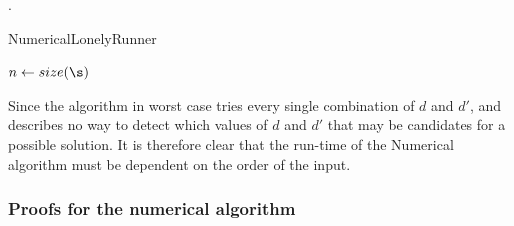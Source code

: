  .

\begin{algorithm}[H]
  \caption{NumericalLonelyRunner}
  \highlights
  
  $n \gets size(\s)$

  \return \no
\end{algorithm}

Since the algorithm in worst case tries every single combination of
$d$ and $d\prime$, and \cite{invis} describes no way to detect which
values of $d$ and $d\prime$ that may be candidates for a possible
solution. It is therefore clear that the run-time of the Numerical
algorithm must be dependent on the order of the input.

\subsubsection{Proofs for the numerical algorithm}

